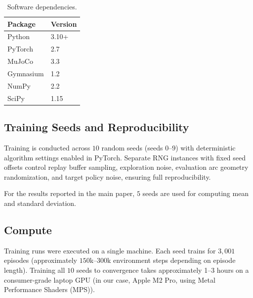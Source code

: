 \begin{table}[h]
\centering
\caption{Software dependencies.}
\label{tab:software}
\begin{tabular}{ll}
\toprule
\textbf{Package} & \textbf{Version} \\
\midrule
Python     & 3.10+  \\
PyTorch    & 2.7    \\
MuJoCo     & 3.3    \\
Gymnasium  & 1.2    \\
NumPy      & 2.2    \\
SciPy      & 1.15   \\
\bottomrule
\end{tabular}
\end{table}

\subsection{Training Seeds and Reproducibility}

Training is conducted across $10$ random seeds (seeds $0$--$9$) with deterministic algorithm settings enabled in PyTorch.
Separate RNG instances with fixed seed offsets control replay buffer sampling, exploration noise, evaluation arc geometry randomization, and target policy noise, ensuring full reproducibility.

For the results reported in the main paper, $5$ seeds are used for computing mean and standard deviation.

\subsection{Compute}

Training runs were executed on a single machine. Each seed trains for $3{,}001$ episodes (approximately $150$k--$300$k environment steps depending on episode length).
Training all $10$ seeds to convergence takes approximately 1--3 hours on a consumer-grade laptop GPU (in our case, Apple M2 Pro, using Metal Performance Shaders (MPS)).